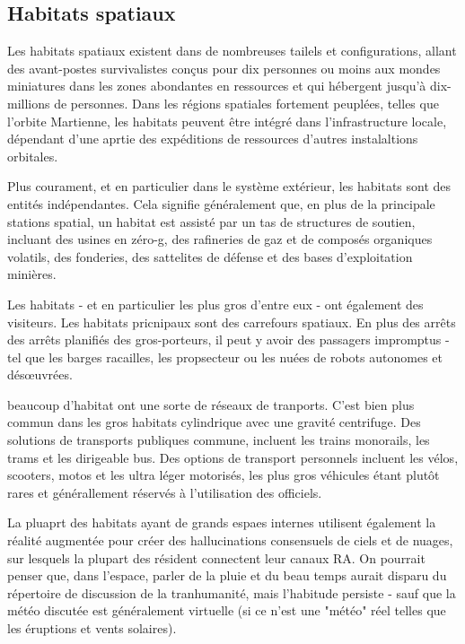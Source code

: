 \subsection{Habitats spatiaux} 

Les habitats spatiaux existent dans de nombreuses tailels et configurations, allant des avant-postes survivalistes conçus pour dix personnes ou moins aux mondes miniatures dans les zones abondantes en ressources et qui hébergent jusqu'à dix-millions de personnes. Dans les régions spatiales fortement peuplées, telles que l'orbite Martienne, les habitats peuvent être intégré dans l'infrastructure locale, dépendant d'une aprtie des expéditions de ressources d'autres instalaltions orbitales. 

Plus courament, et en particulier dans le système extérieur, les habitats sont des entités indépendantes. Cela signifie généralement que, en plus de la principale stations spatial, un habitat est assisté par un tas de structures de soutien, incluant des usines en zéro-g, des rafineries de gaz et de composés organiques volatils, des fonderies, des sattelites de défense et des bases d'exploitation minières. 

Les habitats - et en particulier les plus gros d'entre eux - ont également des visiteurs. Les habitats pricnipaux sont des carrefours spatiaux. En plus des arrêts des arrêts planifiés des gros-porteurs, il peut y avoir des passagers impromptus - tel que les barges racailles, les propsecteur ou les nuées de robots autonomes et désœuvrées. 

beaucoup d'habitat ont une sorte de réseaux de tranports. C'est bien plus commun dans les gros habitats cylindrique avec une gravité centrifuge. Des solutions de transports publiques commune, incluent les trains monorails, les trams et les dirigeable bus. Des options de transport personnels incluent les vélos, scooters, motos et les ultra léger motorisés, les plus gros véhicules étant plutôt rares et générallement réservés à l'utilisation des officiels. 

La pluaprt des habitats ayant de grands espaes internes utilisent également la réalité augmentée pour créer des hallucinations consensuels de ciels et de nuages, sur lesquels la plupart des résident connectent leur canaux RA. On pourrait penser que, dans l'espace, parler de la pluie et du beau temps aurait disparu du répertoire de discussion de la tranhumanité, mais l'habitude persiste - sauf que la météo discutée est généralement virtuelle (si ce n'est une "météo" réel telles que les éruptions et vents solaires). 

